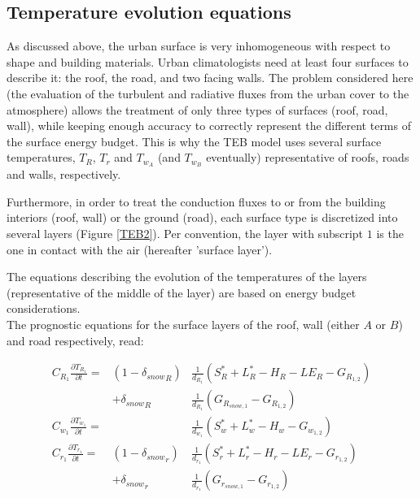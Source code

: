 
\subsection{Temperature evolution equations\label{T}}

As discussed above, the urban surface is very inhomogeneous with
respect to shape and building materials.
Urban climatologists need at least four surfaces
to describe it: the roof, the road, and two facing walls.
The problem considered here (the evaluation of the turbulent and radiative
fluxes from the urban cover to the atmosphere) allows the treatment of only
three types of surfaces (roof, road, wall), while keeping enough accuracy
to correctly represent the different terms of the surface energy budget.
This is why the TEB model uses several surface temperatures,
$T_R$, $T_r$ and $T_{w_A}$ (and $T_{w_B}$ eventually) representative
of roofs, roads and walls, respectively. 

Furthermore, in order to treat the conduction fluxes to or from the building
interiors (roof, wall) or the ground (road), each surface type
is discretized into several layers (Figure \ref{TEB2}).
Per convention, the layer with subscript $1$ is the one
in contact with the air (hereafter 'surface layer').

The equations describing the  evolution  of the temperatures of the layers
(representative of the middle of the layer)
are based on energy budget considerations.\\

The prognostic equations for the surface layers of the roof,
wall (either $A$ or $B$) and road respectively, read:

\begin{eqnarray}
C_{R_1}\frac{\partial T_{R_1} }{\partial t} = &(1-{\delta_{snow}}_R)&\frac{1}{d_{R_1}}
\left( S_{R}^* + L_{R}^* - H_R -LE_R  - G_{R_{1,2}} \right) \nonumber \\
&+ {\delta_{snow}}_R&\frac{1}{d_{R_1}}
\left( G_{R_{snow,1}} - G_{R_{1,2}} \right)  \nonumber \\
C_{w_1}\frac{\partial T_{w_1} }{\partial t} = &&\frac{1}{d_{w_1}}
\left( S_{w}^* + L_{w}^* - H_w   - G_{w_{1,2}} \right)\nonumber \\
C_{r_1}\frac{\partial T_{r_1} }{\partial t} = &(1-{\delta_{snow}}_r)&\frac{1}{d_{r_1}}
\left( S_{r}^* + L_{r}^* - H_r -LE_r  - G_{r_{1,2}} \right) \nonumber \\
&+ {\delta_{snow}}_r&\frac{1}{d_{r_1}}
\left( G_{r_{snow,1}} - G_{r_{1,2}}  \right) \nonumber
\end{eqnarray}

